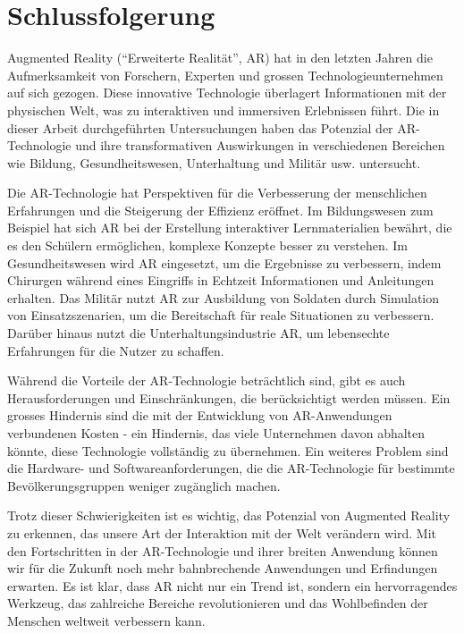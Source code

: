 \section{Schlussfolgerung}

Augmented Reality (“Erweiterte Realität”, AR) hat in den letzten Jahren die Aufmerksamkeit von Forschern, Experten und grossen Technologieunternehmen auf sich gezogen. Diese innovative Technologie überlagert Informationen mit der physischen Welt, was zu interaktiven und immersiven Erlebnissen führt. Die in dieser Arbeit durchgeführten Untersuchungen haben das Potenzial der AR-Technologie und ihre transformativen Auswirkungen in verschiedenen Bereichen wie Bildung, Gesundheitswesen, Unterhaltung und Militär usw. untersucht.

Die AR-Technologie hat Perspektiven für die Verbesserung der menschlichen Erfahrungen und die Steigerung der Effizienz eröffnet. Im Bildungswesen zum Beispiel hat sich AR bei der Erstellung interaktiver Lernmaterialien bewährt, die es den Schülern ermöglichen, komplexe Konzepte besser zu verstehen. Im Gesundheitswesen wird AR eingesetzt, um die Ergebnisse zu verbessern, indem Chirurgen während eines Eingriffs in Echtzeit Informationen und Anleitungen erhalten. Das Militär nutzt AR zur Ausbildung von Soldaten durch Simulation von Einsatzszenarien, um die Bereitschaft für reale Situationen zu verbessern. Darüber hinaus nutzt die Unterhaltungsindustrie AR, um lebensechte Erfahrungen für die Nutzer zu schaffen.

Während die Vorteile der AR-Technologie beträchtlich sind, gibt es auch Herausforderungen und Einschränkungen, die berücksichtigt werden müssen. Ein grosses Hindernis sind die mit der Entwicklung von AR-Anwendungen verbundenen Kosten - ein Hindernis, das viele Unternehmen davon abhalten könnte, diese Technologie vollständig zu übernehmen. Ein weiteres Problem sind die Hardware- und Softwareanforderungen, die die AR-Technologie für bestimmte Bevölkerungsgruppen weniger zugänglich machen.

Trotz dieser Schwierigkeiten ist es wichtig, das Potenzial von Augmented Reality zu erkennen, das unsere Art der Interaktion mit der Welt verändern wird. Mit den Fortschritten in der AR-Technologie und ihrer breiten Anwendung können wir für die Zukunft noch mehr bahnbrechende Anwendungen und Erfindungen erwarten. Es ist klar, dass AR nicht nur ein Trend ist, sondern ein hervorragendes Werkzeug, das zahlreiche Bereiche revolutionieren und das Wohlbefinden der Menschen weltweit verbessern kann.